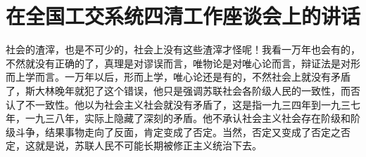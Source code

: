 \section[在全国工交系统四清工作座谈会上的讲话（一九六五年七月二十日）]{在全国工交系统四清工作座谈会上的讲话}


社会的渣滓，也是不可少的，社会上没有这些渣滓才怪呢！我看一万年也会有的，不然就没有正确的了，真理是对谬误而言，唯物论是对唯心论而言，辩证法是对形而上学而言。一万年以后，形而上学，唯心论还是有的，不然社会上就没有矛盾了，斯大林晚年就犯了这个错误，他只是强调苏联社会各阶级人民的一致性，而否认了不一致性。他以为社会主义社会就没有矛盾了，这是指一九三四年到一九三七年，一九三八年，实际上隐藏了深刻的矛盾。他不承认社会主义社会存在阶级和阶级斗争，结果事物走向了反面，肯定变成了否定。当然，否定又变成了否定之否定，这就是说，苏联人民不可能长期被修正主义统治下去。


